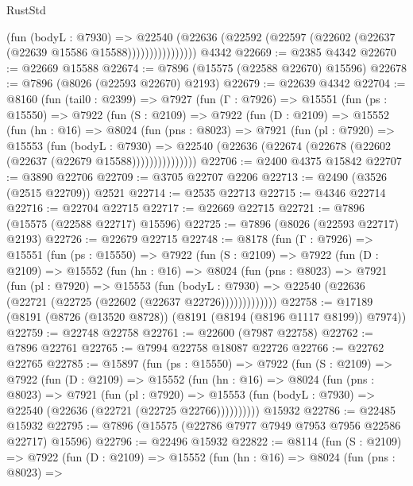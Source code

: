 \begin{lexlean}{RustStd}
\begin{coremodule}
                      (fun (bodyL : @7930) =>
                      @22540
                        (@22636
                          (@22592 (@22597 (@22602 (@22637 (@22639 @15586 @15588))))))))))))))))
    @4342
@22669 := @2385 @4342
@22670 := @22669 @15588
@22674 := @7896 (@15575 (@22588 @22670) @15596)
@22678 := @7896 (@8026 (@22593 @22670) @2193)
@22679 := @22639 @4342
@22704 := @8160
    (fun (tail0 : @2399) =>
    @7927
      (fun (Γ : @7926) =>
      @15551
        (fun (ps : @15550) =>
        @7922
          (fun (S : @2109) =>
          @7922
            (fun (D : @2109) =>
            @15552
              (fun (hn : @16) =>
              @8024
                (fun (pns : @8023) =>
                @7921
                  (fun (pl : @7920) =>
                  @15553
                    (fun (bodyL : @7930) =>
                    @22540 (@22636 (@22674 (@22678 (@22602 (@22637 (@22679 @15588)))))))))))))))
@22706 := @2400 @4375 @15842
@22707 := @3890 @22706
@22709 := @3705 @22707 @2206
@22713 := @2490 (@3526 (@2515 @22709)) @2521
@22714 := @2535 @22713
@22715 := @4346 @22714
@22716 := @22704 @22715
@22717 := @22669 @22715
@22721 := @7896 (@15575 (@22588 @22717) @15596)
@22725 := @7896 (@8026 (@22593 @22717) @2193)
@22726 := @22679 @22715
@22748 := @8178
    (fun (Γ : @7926) =>
    @15551
      (fun (ps : @15550) =>
      @7922
        (fun (S : @2109) =>
        @7922
          (fun (D : @2109) =>
          @15552
            (fun (hn : @16) =>
            @8024
              (fun (pns : @8023) =>
              @7921
                (fun (pl : @7920) =>
                @15553
                  (fun (bodyL : @7930) =>
                  @22540 (@22636 (@22721 (@22725 (@22602 (@22637 @22726)))))))))))))
@22758 := @17189 (@8191 (@8726 (@13520 @8728)) (@8191 (@8194 (@8196 @1117 @8199)) @7974))
@22759 := @22748 @22758
@22761 := @22600 (@7987 @22758)
@22762 := @7896 @22761
@22765 := @7994 @22758 @18087 @22726
@22766 := @22762 @22765
@22785 := @15897
    (fun (ps : @15550) =>
    @7922
      (fun (S : @2109) =>
      @7922
        (fun (D : @2109) =>
        @15552
          (fun (hn : @16) =>
          @8024
            (fun (pns : @8023) =>
            @7921
              (fun (pl : @7920) =>
              @15553 (fun (bodyL : @7930) => @22540 (@22636 (@22721 (@22725 @22766))))))))))
    @15932
@22786 := @22485 @15932
@22795 := @7896 (@15575 (@22786 @7977 @7949 @7953 @7956 @22586 @22717) @15596)
@22796 := @22496 @15932
@22822 := @8114
    (fun (S : @2109) =>
    @7922
      (fun (D : @2109) =>
      @15552
        (fun (hn : @16) =>
        @8024
          (fun (pns : @8023) =>

\end{coremodule}
\end{lexlean}
